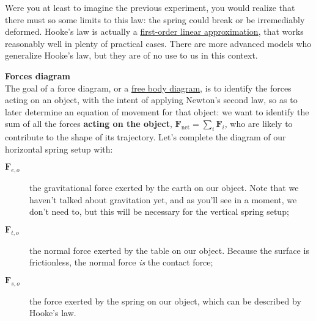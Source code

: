 \documentclass[solutions.tex]{subfiles}
\renewcommand{\bm}[1]{\pmb{#1}}
\begin{document}
\begin{remark} Were you at least to imagine the previous experiment,
you would realize that there must so some limits to this law: the spring
could break or be irremediably deformed. Hooke's law is actually
a \href{https://en.wikipedia.org/wiki/Taylor\_series}
{first-order linear approximation}, that works reasonably
well in plenty of practical cases. There are more advanced models who
generalize Hooke's law, but they are of no use to us in this context.
\end{remark}

\hr
\textbf{Forces diagram} \\
The goal of a force diagram, or a
\href{https://en.wikipedia.org/wiki/Free\_body\_diagram}
{free body diagram}, is to identify the forces acting on an object,
with the intent of applying Newton's second law, so as to later
determine an equation of movement for that object: we want to identify
the sum of all the forces \textbf{acting on the object},
$\bm{F}_\text{net}=\sum_i\bm{F}_i$, who are likely to contribute
to the shape of its trajectory. Let's complete the diagram of
our horizontal spring setup with:

\begin{description}
	\item[$\bm{F}_{e,o}$] the gravitational force exerted by the earth on
	our object. Note that we haven't talked about gravitation yet, and
	as you'll see in a moment, we don't need to, but this will be necessary
	for the vertical spring setup;
	\item[$\bm{F}_{t,o}$] the normal force exerted by the table on our
	object. Because the surface is frictionless, the normal force
	\textit{is} the contact force;
	\item[$\bm{F}_{s,o}$] the force exerted by the spring on our object,
	which can be described by Hooke's law.
\end{description}
\end{document}
